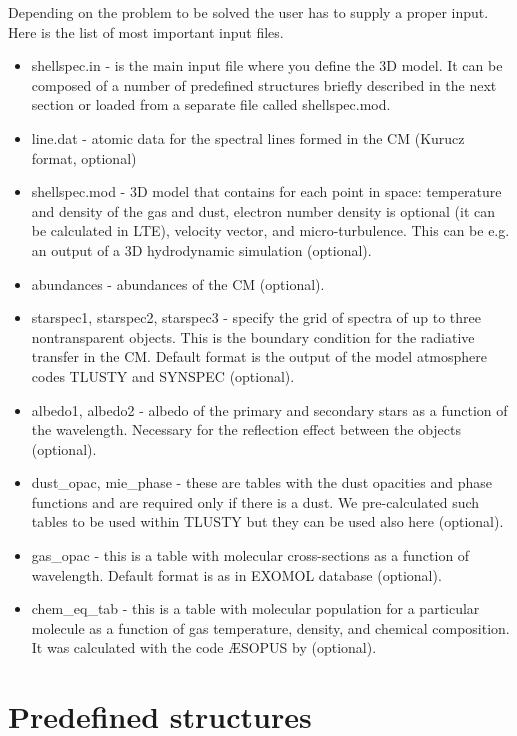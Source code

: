 \documentclass[11pt,twoside]{article}
\begin{document}
Depending on the problem to be solved the user has to supply 
a proper input.
Here is the list of most important input files.
\begin{itemize}
\item 
shellspec.in - is the main input file where you define the 3D model.
It can be composed of a number of predefined structures briefly 
described in the next section or loaded from a separate file called 
shellspec.mod.
\item 
line.dat - atomic data for the spectral lines formed in the CM 
(Kurucz format, optional)
\item 
shellspec.mod - 3D model that contains for each point 
in space: temperature and density of the gas and dust, electron number
density is optional (it can be calculated in LTE), velocity vector,
and micro-turbulence. This can be e.g. an output of a 3D 
hydrodynamic simulation (optional).
\item 
abundances  - abundances of the CM (optional).
\item 
starspec1, starspec2, starspec3 - specify the grid of spectra of up to 
three nontransparent objects. This is the boundary condition for 
the radiative transfer in the CM. Default format is the output of
the model atmosphere codes TLUSTY and SYNSPEC (optional).
\item 
albedo1, albedo2 - albedo of the primary and secondary stars as 
a function of the wavelength.
Necessary for the reflection effect between the objects (optional).
\item 
dust\_opac, mie\_phase - these are tables with the dust opacities and
phase functions and are required only if there is a dust.
We pre-calculated such tables to be used within TLUSTY but they can be 
used also here \citep{budaj15} (optional).
\item 
gas\_opac - this is a table with molecular cross-sections as a function 
of wavelength. Default format is as in EXOMOL database
\citep{tennyson12} (optional).
\item 
chem\_eq\_tab - this is a table with molecular population for 
a particular molecule as a function of gas temperature, density, 
and chemical composition. It was calculated with the code {\AE}SOPUS by 
\cite{marigo09} (optional).
\end{itemize}


\section{Predefined structures}
\end{document}

